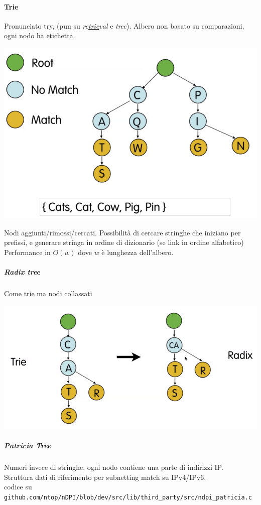 \documentclass[10pt]{book}
\begin{document}
\paragraph{Trie} Pronunciato try, (pun su \textit{re\underline{trie}val} e \textit{tree}). Albero non basato su comparazioni, ogni nodo ha etichetta.
\begin{center}
	\includegraphics[scale=0.5]{tries.png}
\end{center}
Nodi aggiunti/rimossi/cercati. Possibilità di cercare stringhe che iniziano per prefissi, e generare stringa in ordine di dizionario (se link in ordine alfabetico)
Performance in $O(w)$ dove $w$ è lunghezza dell'albero.
\subparagraph{Radix tree} Come trie ma nodi collassati
\begin{center}
	\includegraphics[scale=0.5]{radixtrie.png}
\end{center}
\subparagraph{Patricia Tree} Numeri invece di stringhe, ogni nodo contiene una parte di indirizzi IP.\\
Struttura dati di riferimento per subnetting match su IPv4/IPv6.\\
codice su \texttt{github.com/ntop/nDPI/blob/dev/src/lib/third\_party/src/ndpi\_patricia.c}
\end{document}
